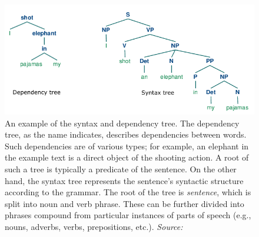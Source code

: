 \begin{figure}[h]
\centering
\includegraphics[width=1\textwidth]{../img/syntax_depedency_trees.png}
\caption{
An example of the syntax and dependency tree. The dependency tree, as the name indicates, describes dependencies between words. Such dependencies are of various types; for example, an elephant in the example text is a direct object of the shooting action. A root of such a tree is typically a predicate of the sentence. On the other hand, the syntax tree represents the sentence's syntactic structure according to the grammar. The root of the tree is \textit{sentence}, which is split into noun and verb phrase. These can be further divided into phrases compound from particular instances of parts of speech (e.g., nouns, adverbs, verbs, prepositions, etc.).
\newline \textit{Source: \cite{NLTKbook}}}
\label{fig:trees}
\end{figure}

